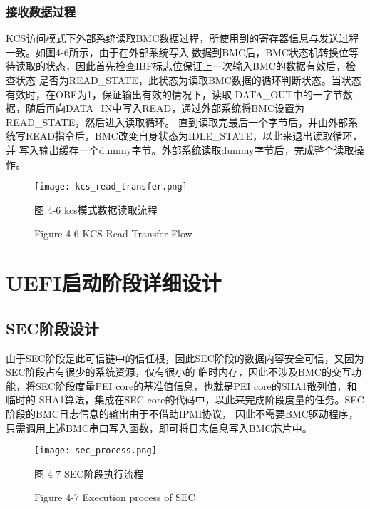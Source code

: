 \subsubsection{接收数据过程}
KCS访问模式下外部系统读取BMC数据过程，所使用到的寄存器信息与发送过程一致。如图4-6所示，由于在外部系统写入
数据到BMC后，BMC状态机转换位等待读取的状态，因此首先检查IBF标志位保证上一次输入BMC的数据有效后，检查状态
是否为READ\_STATE，此状态为读取BMC数据的循环判断状态。当状态有效时，在OBF为1，保证输出有效的情况下，读取
DATA\_OUT中的一字节数据，随后再向DATA\_IN中写入READ，通过外部系统将BMC设置为READ\_STATE，然后进入读取循环。
直到读取完最后一个字节后，并由外部系统写READ指令后，BMC改变自身状态为IDLE\_STATE，以此来退出读取循环，并
写入输出缓存一个dummy字节。外部系统读取dummy字节后，完成整个读取操作。

\begin{figure}[H]
    \vspace{0cm}   
    \setlength{\abovecaptionskip}{0.3cm}
	\centering
    \texttt{[image: kcs\_read\_transfer.png]}
    \caption*{图 4-6 kcs模式数据读取流程}
    \setlength{\belowcaptionskip}{-0.7cm}
    \caption*{Figure 4-6 KCS Read Transfer Flow}
\end{figure}

%
%
\section{UEFI启动阶段详细设计}

\subsection{SEC阶段设计}
由于SEC阶段是此可信链中的信任根，因此SEC阶段的数据内容安全可信，又因为SEC阶段占有很少的系统资源，仅有很小的
临时内存，因此不涉及BMC的交互功能，将SEC阶段度量PEI core的基准值信息，也就是PEI core的SHA1散列值，和临时的
SHA1算法，集成在SEC core的代码中，以此来完成阶段度量的任务。SEC阶段的BMC日志信息的输出由于不借助IPMI协议，
因此不需要BMC驱动程序，只需调用上述BMC串口写入函数，即可将日志信息写入BMC芯片中。

\begin{figure}[htb]
    \vspace{0cm}   
    \setlength{\abovecaptionskip}{0.3cm}
	\centering
    \texttt{[image: sec\_process.png]}
    \caption*{图 4-7 SEC阶段执行流程}
    \setlength{\belowcaptionskip}{-0.7cm}
    \caption*{Figure 4-7 Execution process of SEC}
\end{figure}

